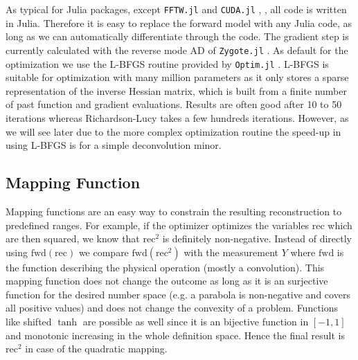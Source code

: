 \documentclass{juliacon}
\begin{document}
As typical for Julia packages, except \verb|FFTW.jl| and \verb|CUDA.jl| \cite{besard2018juliagpu}, \cite{LLVM.jl-2017}, all code is written in Julia.
Therefore it is easy to replace the forward model with any Julia code, as long as we can 
automatically differentiate through the code. The gradient step is currently calculated with the reverse mode AD of \verb|Zygote.jl| \cite{Zygote.jl-2018}. 
As default for the optimization we use the L-BFGS \cite{LBFGS} routine provided by \verb|Optim.jl| \cite{mogensen2018optim}.
L-BFGS is suitable for optimization with many million parameters as it only stores a sparse representation of the inverse Hessian matrix,
which is built from a finite number of past function and gradient evaluations. 
Results are often good after 10 to 50 iterations whereas Richardson-Lucy takes
a few hundreds iterations. 
However, as we will see later due to the more complex optimization routine the speed-up in using L-BFGS is for a simple 
deconvolution minor.



\subsection{Mapping Function}
    Mapping functions are an easy way to constrain the resulting reconstruction to predefined ranges.
    For example, if the optimizer optimizes the variables $\text{rec}$ which are then squared, we know that
    $\text{rec}^2$ is definitely non-negative. Instead of directly using $\text{fwd}(\text{rec})$ we compare
    $\text{fwd}(\text{rec}^2)$ with the measurement $Y$ where $\text{fwd}$ is the function describing the physical operation (mostly 
            a convolution). 
    This mapping function does not change the outcome as long
    as it is an surjective function for the desired number space (e.g. a parabola is non-negative and covers all positive values) 
    and does not change the convexity of a problem.
    Functions like shifted $\tanh$ are possible as well since it is an bijective function in $[-1, 1]$ and monotonic increasing
    in the whole definition space.
    Hence the final result is $\text{rec}^2$ in case of the quadratic mapping.
\end{document}
